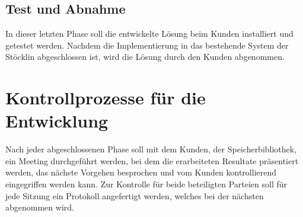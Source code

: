 \subsection{Test und Abnahme}
In dieser letzten Phase soll die entwickelte Lösung beim Kunden installiert und getestet werden. Nachdem die Implementierung in das bestehende System der Stöcklin abgeschlossen ist, wird die Lösung durch den Kunden abgenommen.

\section{Kontrollprozesse für die Entwicklung}
Nach jeder abgeschlossenen Phase soll mit dem Kunden, der Speicherbibliothek, ein Meeting durchgeführt werden, bei dem die erarbeiteten Resultate präsentiert werden, das nächste Vorgehen besprochen und vom Kunden kontrollierend eingegriffen werden kann. Zur Kontrolle für beide beteiligten Parteien soll für jede Sitzung ein Protokoll angefertigt werden, welches bei der nächsten abgenommen wird.
